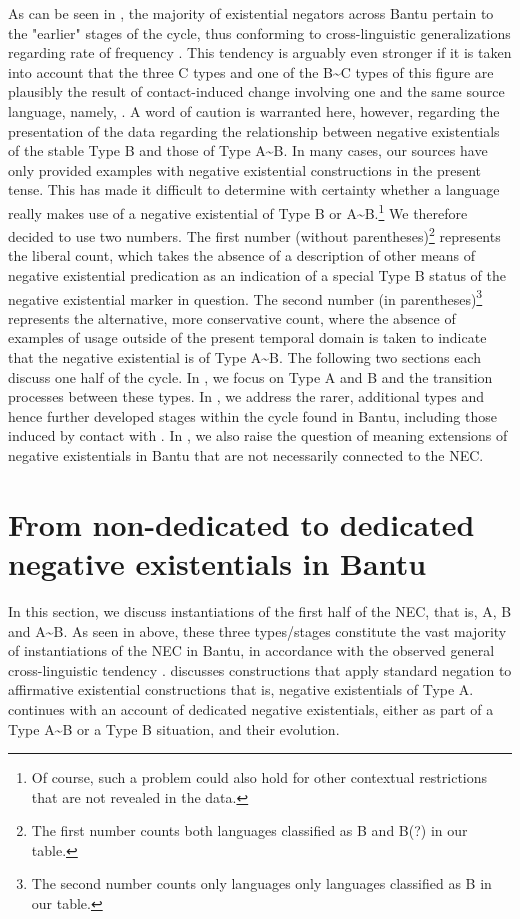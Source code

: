 \documentclass[output=paper,draft,draftmode,colorlinks,citecolor=brown]{langscibook}
\begin{document}
As can be seen in
, the majority
of existential negators across Bantu pertain to the "earlier" stages of the
cycle, thus conforming to cross-linguistic generalizations 
regarding rate of frequency \parencites{Croft1991}{Veselinova2016}. This
tendency is arguably even stronger if it is taken into account that the
three C types and one of the B{\textasciitilde}C types of this figure are
plausibly the result of contact-induced change involving one and the same
source language, namely, . A word of caution is warranted here,
however, regarding the presentation of the data regarding the relationship between negative existentials of
the stable Type B and those of Type A{\textasciitilde}B. In many cases, our
sources have only provided examples with negative existential constructions
in the present tense. This has made it difficult to determine with
certainty whether a language really makes use of a negative existential of
Type B or A{\textasciitilde}B.\footnote{Of course, such a problem could
also hold for other contextual restrictions that are not revealed in the
data.} We therefore decided to use two numbers. The first number (without
parentheses)\footnote{The first number counts both languages classified as B and B(?) in our table.} represents the liberal count, which takes the absence of a
description of other means of negative existential predication as an
indication of a special Type B status of the negative existential marker in
question. The second number (in parentheses)\footnote{The second number counts only languages only languages classified as B in our table.} represents the alternative,
more conservative count, where the absence of examples of usage outside of
the present temporal domain is taken to indicate that the negative
existential is of Type A{\textasciitilde}B.
The following two sections each discuss one half of the cycle. In
, we focus on Type A and B and the transition processes
between these types. In , we address the rarer, additional
types and hence further developed stages within the cycle found in Bantu,
including those induced by contact with . In , we also raise the question of meaning extensions of negative existentials in Bantu that are not necessarily connected to the NEC.

\section{From non-dedicated to dedicated negative existentials in Bantu}\label{sec:1:5}
In this section, we discuss instantiations of the first half of the NEC,
that is, A, B and A{\textasciitilde}B. As seen in 
above, these three types/stages constitute the vast majority of
instantiations of the NEC in Bantu, in accordance with the observed general
cross-linguistic tendency \citep{Veselinova2016,Croft1991}.
 discusses constructions that apply standard negation
to affirmative existential constructions \textemdash that is, negative existentials of
Type A.  continues with an account of dedicated negative
existentials, either as part of a Type A{\textasciitilde}B or a Type B
situation, and their evolution.
\end{document}

